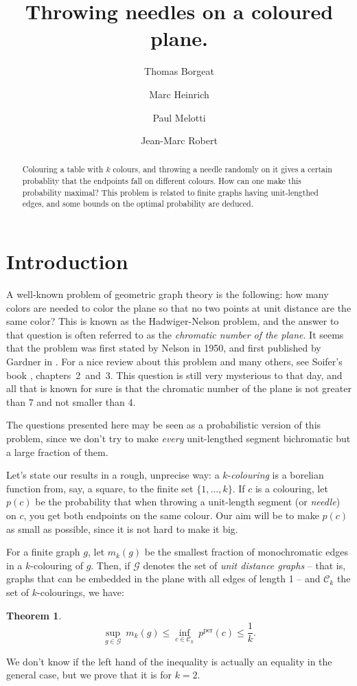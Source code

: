 \documentclass[a4paper,11pt]{article}
\title{Throwing needles on a coloured plane.}
\author[1]{Thomas Borgeat}
\author[1]{Marc Heinrich}
\author[1]{Paul Melotti}
\affil[1]{Computer science departement,\authorcr
\'Ecole Normale Sup\'erieure, Paris, France\authorcr
		  \texttt{\{surname\}.\{name\}@ens.fr}
}
\author[2]{Jean-Marc Robert}
\affil[2]{Software engeneering and IT departement,\authorcr
Ecole de Technologie Sup\'erieure, Montreal, Canada\authorcr
		  \texttt{jean-marc.robert@etsmlt.ca}
}
\newtheorem*{theo*}{Theorem}
\theoremstyle{definition}
\theoremstyle{remark}
\newcommand{\C}{\mathcal{C}}
\newcommand{\pper}{p^{\mathrm{per}}}
\begin{document}
\maketitle

\begin{abstract} Colouring a table with $k$ colours, and throwing a needle
randomly on it gives a certain probablity that the endpoints fall on 
different colours. How can one make this probability maximal?
This problem is related to finite graphs having unit-lengthed edges, and 
some bounds on the optimal probability are deduced.\end{abstract}

\section{Introduction}

A well-known problem of geometric graph theory is the following: how many colors
are needed to color the plane so that no two points at unit distance are the 
same color? This is known as the Hadwiger-Nelson problem, and the answer to that
question is often referred to as the \textit{chromatic number of the plane}. It 
seems that the problem was first stated by Nelson in 1950, and first published by 
Gardner in \cite{gardner}.
For a nice review about this problem and many others, see Soifer's book
\cite{soifer}, chapters~2~and~3. This question is still very mysterious to that day, and all that 
is known for sure is that the chromatic number of the plane is not greater than
7 and not smaller than 4.

The questions presented here may be seen as a probabilistic version of this 
problem, since we don't try to make \textit{every} unit-lengthed segment 
bichromatic but a large fraction of them.

\medskip

Let's state our results in a rough, unprecise way: a $k$-\textit{colouring} is a borelian 
function from, say, a square, to the finite set $\{1, \dots , k \}$. If $c$
is a colouring, let $p(c)$ be the probability that when throwing a unit-length
segment (or \textit{needle}) on $c$, you get both endpoints on the same colour.
Our aim will be to make $p(c)$ as small as possible, since it is not hard
to make it big.

For a finite graph $g$, let $m_k(g)$ be the smallest fraction of monochromatic
edges in a $k$-colouring of $g$. Then, if $\mathcal{G}$ denotes the set of 
\textit{unit distance graphs} -- that is, graphs that can be embedded in the
plane with all edges of length 1 -- and $\C_k$ the set of $k$-colourings, we
have:
\begin{theo*}
$$ \sup_{g \in \mathcal{G}} \ m_k(g) \leq \inf_{c \in \C_k} \ \pper(c) \leq \frac{1}{k}. $$
\end{theo*}
We don't know if the left hand of the inequality is actually an equality in
the general case, but we prove that it is for $k=2$.
\end{document}
